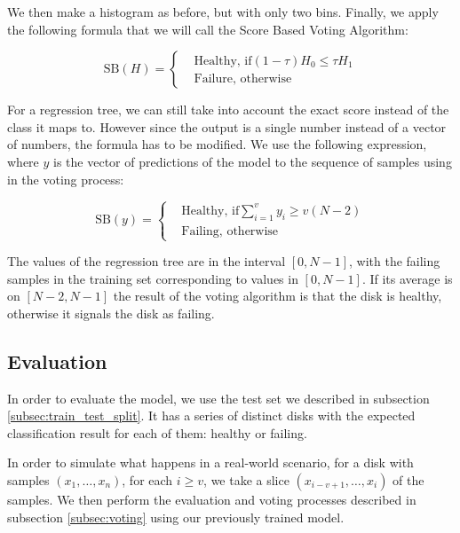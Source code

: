 We then make a histogram as before, but with only two bins.
Finally, we apply the following formula that we will call the Score Based Voting Algorithm:

\begin{equation}\label{eq:score_based_voting}
  \text{SB}(H) = 
    \begin{cases}
        & \text{Healthy, if} (1-\tau)H_0 \leq \tau H_1 \\
        & \text{Failure, otherwise} 
  \end{cases}
\end{equation}

For a regression tree, we can still take into account the exact score instead of the class it maps to.
However since the output is a single number instead of a vector of numbers, the formula has to be modified.
We use the following expression, where $y$ is the vector of predictions of the model to the sequence of samples using in the voting process:

\begin{equation}\label{eq:score_based_voting_regression}
  \text{SB}(y) = 
    \begin{cases}
        & \text{Healthy, if} \sum_{i=1}^v y_i \geq v(N-2) \\
        & \text{Failing, otherwise} 
  \end{cases}
\end{equation}

The values of the regression tree are in the interval $[0,N-1]$, with the failing samples in the training set corresponding to values in $[0,N-1]$.
If its average is on $[N-2,N-1]$ the result of the voting algorithm is that the disk is healthy, otherwise it signals the disk as failing.

\subsection{Evaluation}

In order to evaluate the model, we use the test set we described in subsection \ref{subsec:train_test_split}.
It has a series of distinct disks with the expected classification result for each of them: healthy or failing.

In order to simulate what happens in a real-world scenario, for a disk with samples $(x_1,\dots,x_n)$, for each $i \geq v$, we take a slice $(x_{i-v+1}, \dots, x_i)$ of the samples.
We then perform the evaluation and voting processes described in subsection \ref{subsec:voting} using our previously trained model.

